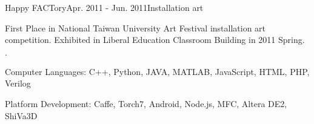 \documentclass{joel_cv}
\begin{document}
\begin{sectionContentNormal}{Happy FACTory}{Apr. 2011 - Jun. 2011}{Installation art}
	\item First Place in National Taiwan University Art Festival installation art competition. Exhibited in Liberal Education Classroom Building in 2011 Spring.
\end{sectionContentNormal}

%
%

\begin{sectionItemize}{$\cdot$}
	\item Computer Languages: C++, Python, JAVA, MATLAB, JavaScript, HTML, PHP, Verilog
	\item Platform Development: Caffe, Torch7, Android, Node.js, MFC, Altera DE2, ShiVa3D
\end{sectionItemize}
\end{document}
